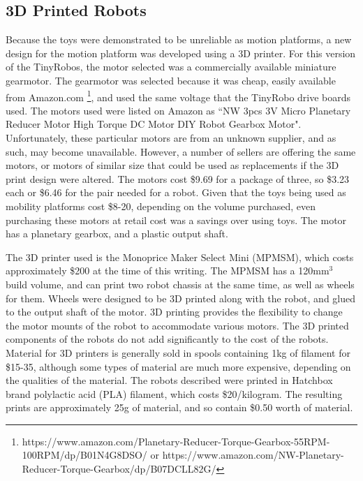 \subsection{3D Printed Robots}

Because the toys were demonstrated to be unreliable as motion platforms, a new design for the motion platform was developed using a 3D printer. 
For this version of the TinyRobos, the motor selected was a commercially available miniature gearmotor. 
The gearmotor was selected because it was cheap, easily available from Amazon.com \footnote{https://www.amazon.com/Planetary-Reducer-Torque-Gearbox-55RPM-100RPM/dp/B01N4G8DSO/ or https://www.amazon.com/NW-Planetary-Reducer-Torque-Gearbox/dp/B07DCLL82G/}, and used the same voltage that the TinyRobo drive boards used. 
The motors used were listed on Amazon as ``NW 3pcs 3V Micro Planetary Reducer Motor High Torque DC Motor DIY Robot Gearbox Motor". 
Unfortunately, these particular motors are from an unknown supplier, and as such, may become unavailable. 
However, a number of sellers are offering the same motors, or motors of similar size that could be used as replacements if the 3D print design were altered. 
The motors cost \$9.69 for a package of three, so \$3.23 each or \$6.46 for the pair needed for a robot. 
Given that the toys being used as mobility platforms cost \$8-20, depending on the volume purchased, even purchasing these motors at retail cost was a savings over using toys.
The motor has a planetary gearbox, and a plastic output shaft. 

The 3D printer used is the Monoprice Maker Select Mini (MPMSM), which costs approximately \$200 at the time of this writing.
The MPMSM has a 120mm$^3$ build volume, and can print two robot chassis at the same time, as well as wheels for them.
Wheels were designed to be 3D printed along with the robot, and glued to the output shaft of the motor. 
3D printing provides the flexibility to change the motor mounts of the robot to accommodate various motors. 
The 3D printed components of the robots do not add significantly to the cost of the robots. 
Material for 3D printers is generally sold in spools containing 1kg of filament for \$15-35, although some types of material are much more expensive, depending on the qualities of the material.
The robots described were printed in Hatchbox brand polylactic acid (PLA) filament, which costs \$20/kilogram. 
The resulting prints are approximately 25g of material, and so contain \$0.50 worth of material. 

